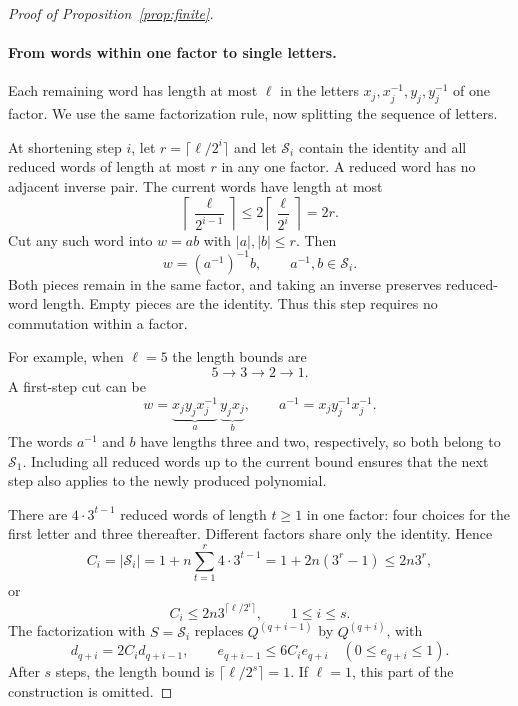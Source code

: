 \documentclass[11pt]{article}
\numberwithin{equation}{section}
\theoremstyle{boldremark}\newtheorem{remark}[theorem]{Remark}
\begin{document}
\begin{proof}[Proof of Proposition~\ref{prop:finite}]
\paragraph{From words within one factor to single letters.}
Each remaining word has length at most $\ell$ in the letters
$x_j,x_j^{-1},y_j,y_j^{-1}$ of one factor. We use the same
factorization rule, now splitting the sequence of letters.

At shortening step $i$, let $r=\lceil\ell/2^i\rceil$ and let
$\mathcal S_i$ contain the identity and all reduced words of length
at most $r$ in any one factor. A reduced word has no adjacent
inverse pair. The current words have length at most
\[
 \left\lceil\frac{\ell}{2^{i-1}}\right\rceil
 \le2\left\lceil\frac{\ell}{2^i}\right\rceil=2r.
\]
Cut any such word into $w=ab$ with $|a|,|b|\le r$. Then
\[
 w=(a^{-1})^{-1}b,\qquad a^{-1},b\in\mathcal S_i.
\]
Both pieces remain in the same factor, and taking an inverse preserves
reduced-word length. Empty pieces are the identity.
Thus this step requires no commutation within a factor.

For example, when $\ell=5$ the length bounds are
\[
 5\longrightarrow3\longrightarrow2\longrightarrow1.
\]
A first-step cut can be
\[
 w=\underbrace{x_jy_jx_j^{-1}}_{a}\,
   \underbrace{y_jx_j}_{b},\qquad
 a^{-1}=x_jy_j^{-1}x_j^{-1}.
\]
The words $a^{-1}$ and $b$ have lengths three and two, respectively,
so both belong to $\mathcal S_1$. Including all reduced words up to
the current bound ensures that the next step also applies to the
newly produced polynomial.

There are $4\cdot3^{t-1}$ reduced words of length $t\ge1$ in one
factor: four choices for the first letter and three thereafter.
Different factors share only the identity. Hence
\[
 C_i=|\mathcal S_i|
 =1+n\sum_{t=1}^r4\cdot3^{t-1}
 =1+2n(3^r-1)\le2n3^r,
\]
or
\begin{equation}
 C_i\le2n3^{\lceil\ell/2^i\rceil},\qquad 1\le i\le s.
 \label{eq:word-counts}
\end{equation}
The factorization with $S=\mathcal S_i$ replaces
$Q^{(q+i-1)}$ by $Q^{(q+i)}$, with
\[
 d_{q+i}=2C_i d_{q+i-1},\qquad
 e_{q+i-1}\le6C_ie_{q+i}
 \quad(0\le e_{q+i}\le1).
\]
After $s$ steps, the length bound is $\lceil\ell/2^s\rceil=1$.
If $\ell=1$, this part of the construction is omitted.


\end{proof}
\end{document}
